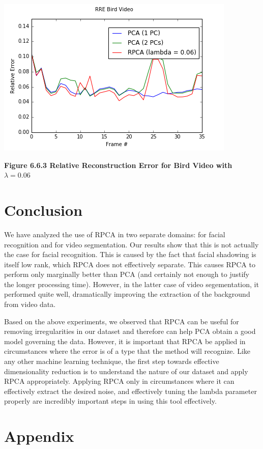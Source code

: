 \documentclass[11pt]{scrartcl} %
\theoremstyle{plain}
\begin{document}
\centerline{\includegraphics[width=\linewidth, width=100mm]{figures_video/crow/rre_006.png}}
\centerline{\textbf{Figure 6.6.3 Relative Reconstruction Error for Bird Video with $\lambda=0.06$ }}
\bigskip

\section{Conclusion}

We have analyzed the use of RPCA in two separate domains: for facial recognition and for video segmentation. Our results show that this is not actually the case for facial recognition. This is caused by the fact that facial shadowing is itself low rank, which RPCA does not effectively separate. This causes RPCA to perform only marginally better than PCA (and certainly not enough to justify the longer processing time). However, in the latter case of video segementation, it performed quite well, dramatically improving the extraction of the background from video data.

Based on the above experiments, we observed that RPCA can be useful for removing irregularities in our dataset and therefore can help PCA obtain a good model governing the data.  However, it is important that RPCA be applied in circumstances where the error is of a type that the method will recognize. Like any other machine learning technique, the first step towards effective dimensionality reduction is to understand the nature of our dataset and apply RPCA appropriately. Applying RPCA only in circumstances where it can effectively extract the desired noise, and effectively tuning the lambda parameter properly are incredibly important steps in using this tool effectively.

\newpage

\section{Appendix}
\end{document}
